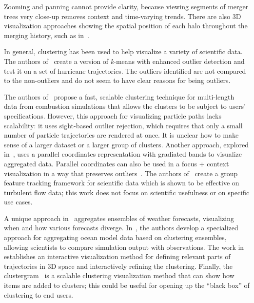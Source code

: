 Zooming and panning cannot provide clarity, because viewing segments of merger trees very close-up removes context and time-varying trends. %
There are also 3D visualization approaches showing the spatial position of each halo throughout the merging history, such as in~\cite{7429496}. %


In general, clustering has been used to help visualize a variety of scientific data. The authors of~\cite{k-means--} create a version of \textit{k}-means with enhanced outlier detection and test it on a set of hurricane trajectories. The outliers identified are not compared to the non-outliers and do not seem to have clear reasons for being outliers.

The authors of~\cite{wei2012} propose a fast, scalable clustering technique for multi-length data from combustion simulations that allows the clusters to be subject to users’ specifications. However, this approach for visualizing particle paths lacks scalability: it uses sight-based outlier rejection, which requires that only a small number of particle trajectories are rendered at once. It is unclear how to make sense of a larger dataset or a larger group of clusters. Another approach, explored in~\cite{hier_parallel}, uses a parallel coordinates representation with gradiated bands to visualize aggregated data. Parallel coordinates can also be used in a focus + context visualization in a way that preserves outliers~\cite{outlier_parallel_coords}. The authors of~\cite{group_dynamics} create a group feature tracking framework for scientific data which is shown to be effective on turbulent flow data; this work does not focus on scientific usefulness or on specific use cases. 

A unique approach in~\cite{weather_ensembles} aggregates ensembles of weather forecasts, visualizing when and how various forecasts diverge. In~\cite{ocean_models}, the authors develop a specialized approach for aggregating ocean model data based on clustering ensembles, allowing scientists to compare simulation output with observations. The work in~\cite{relevant_parts} establishes an interactive visualization method for defining relevant parts of trajectories in 3D space and interactively refining the clustering. Finally, the clustergram~\cite{clustergram} is a scalable clustering visualization method that can show how items are added to clusters; this could be useful for opening up the “black box” of clustering to end users.

